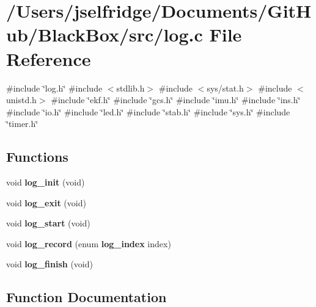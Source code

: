 \section{/\+Users/jselfridge/\+Documents/\+Git\+Hub/\+Black\+Box/src/log.c File Reference}
\label{log_8c}
{\ttfamily \#include \char`\"{}log.\+h\char`\"{}}\newline
{\ttfamily \#include $<$stdlib.\+h$>$}\newline
{\ttfamily \#include $<$sys/stat.\+h$>$}\newline
{\ttfamily \#include $<$unistd.\+h$>$}\newline
{\ttfamily \#include \char`\"{}ekf.\+h\char`\"{}}\newline
{\ttfamily \#include \char`\"{}gcs.\+h\char`\"{}}\newline
{\ttfamily \#include \char`\"{}imu.\+h\char`\"{}}\newline
{\ttfamily \#include \char`\"{}ins.\+h\char`\"{}}\newline
{\ttfamily \#include \char`\"{}io.\+h\char`\"{}}\newline
{\ttfamily \#include \char`\"{}led.\+h\char`\"{}}\newline
{\ttfamily \#include \char`\"{}stab.\+h\char`\"{}}\newline
{\ttfamily \#include \char`\"{}sys.\+h\char`\"{}}\newline
{\ttfamily \#include \char`\"{}timer.\+h\char`\"{}}\newline
\subsection*{Functions}
\begin{DoxyCompactItemize}
\item 
void \textbf{ log\+\_\+init} (void)
\item 
void \textbf{ log\+\_\+exit} (void)
\item 
void \textbf{ log\+\_\+start} (void)
\item 
void \textbf{ log\+\_\+record} (enum \textbf{ log\+\_\+index} index)
\item 
void \textbf{ log\+\_\+finish} (void)
\end{DoxyCompactItemize}


\subsection{Function Documentation}
\mbox{\label{log_8c_ab81db8f48ee8792d529004a0363bfe2d}} 
